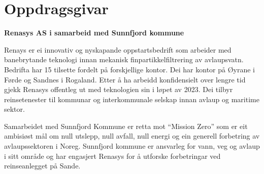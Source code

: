 \section{Oppdragsgivar}
\textbf{Renasys AS i samarbeid med Sunnfjord kommune}

Renays \citep{Renasys} er ei innovativ og nyskapande oppstartsbedrift som arbeider med banebrytande teknologi innan mekanisk finpartikkelfiltrering av avlaupsvatn.
Bedrifta har 15 tilsette fordelt på forskjellige kontor. Dei har kontor på Øyrane i Førde og Sandnes i Rogaland. 
Etter å ha arbeidd konfidensielt over lengre tid gjekk Renasys offentleg ut med teknologien sin i løpet av 2023. 
Dei tilbyr reinsetenester til kommunar og interkommunale selskap innan avlaup og maritime sektor.

Samarbeidet med \gls{Sunnfjord Kommune} \citep{SunnfjordKommune} er retta mot ``Mission Zero'' som er eit ambisiøst mål om 
null utslepp, null avfall, null energi og ein generell forbetring av avlaupssektoren i Noreg. \citep{Zero} \newline
Sunnfjord kommune er ansvarleg for vann, veg og avlaup i sitt område og har engasjert 
Renasys for å utforske forbetringar ved reinseanlegget på Sande.
\newline
\newline


